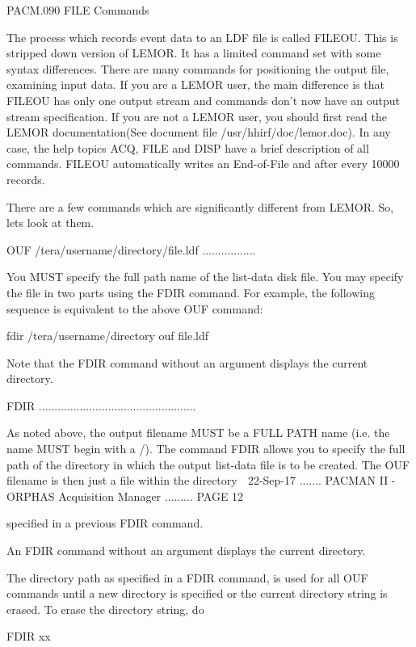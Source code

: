    PACM.090 FILE Commands
 
   The process which records event data to an LDF file is called FILEOU.  This
   is  stripped down version of LEMOR.  It has a limited command set with some
   syntax differences.  There are many  commands  for  positioning  the output
   file,  examining  input data.  If you are a LEMOR user, the main difference
   is that FILEOU has only one output stream and commands don't  now  have  an
   output  stream specification. If you are not a LEMOR user, you should first
   read the LEMOR documentation(See document  file  /usr/hhirf/doc/lemor.doc).
   In  any  case,  the help topics ACQ, FILE and DISP have a brief description
   of all commands. FILEOU  automatically  writes  an  End-of-File  and  after
   every 10000 records.
 
   There  are a few commands which are significantly different from LEMOR. So,
   lets look at them.
 
   OUF /tera/username/directory/file.ldf .................
 
   You MUST specify the full path name of the list-data disk  file.   You  may
   specify  the  file  in  two  parts using the FDIR command. For example, the
   following sequence is equivalent to the above OUF command:
 
         fdir /tera/username/directory
         ouf file.ldf
 
   Note that the  FDIR  command  without  an  argument  displays  the  current
   directory.
 
   FDIR ..................................................
 
   As  noted  above,  the  output  filename MUST be a FULL PATH name (i.e. the
   name MUST begin with a /).  The command  FDIR  allows  you  to  specify the
   full  path  of  the  directory  in which the output list-data file is to be
   created.  The OUF  filename  is  then  just  a  file  within  the directory
    
   22-Sep-17 ....... PACMAN II - ORPHAS Acquisition Manager ......... PAGE  12
 
   specified in a previous FDIR command.
 
   An FDIR command without an argument displays the current directory.
 
   The  directory  path  as  specified  in a FDIR command, is used for all OUF
   commands until a new  directory  is  specified  or  the  current  directory
   string is erased.  To erase the directory string, do
 
         FDIR xx
 
